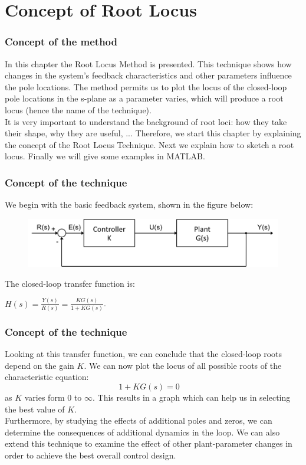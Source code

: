 \section{Concept of Root Locus}

\begin{frame}
\frametitle{Concept of the method}
In this chapter the Root Locus Method is presented. This technique shows how changes in the system's feedback characteristics and other parameters influence the pole locations. The method permits us to plot the locus of the closed-loop pole locations in the s-plane as a parameter varies, which will produce a root locus (hence the name of the technique).\\
\vspace{1em}
It is very important to understand the background of root loci: how they take their shape, why they are useful, ... Therefore, we start this chapter by explaining the concept of the Root Locus Technique. Next we explain how to sketch a root locus. Finally we will give some examples in MATLAB.
\end{frame}

\begin{frame}
\frametitle{Concept of the technique}
	We begin with the basic feedback system, shown in the figure below:
	\begin{figure}
		\centering
		\includegraphics[width=1\linewidth]{closed_loop_diagram}
	\end{figure}
	The closed-loop transfer function is:
	\begin{center}
		$H(s) = \frac{Y(s)}{R(s)} = \frac{KG(s)}{1 + KG(s)}$.
	\end{center}
\end{frame}

\begin{frame}
\frametitle{Concept of the technique}
	Looking at this transfer function, we can conclude that the closed-loop roots depend on the gain $K$. We can now plot the locus of all possible roots of the characteristic equation: 
	\begin{equation}
		1 + KG(s) = 0 \hspace{1em}
	\end{equation}
	as $K$ varies form $0$ to $\infty$. This results in a graph which can help us in selecting the best value of $K$.\\
	\vspace{1em}
	Furthermore, by studying the effects of additional poles and zeros, we can determine the consequences of additional dynamics in the loop. We can also extend this technique to examine the effect of other plant-parameter changes in order to achieve the best overall control design.
\end{frame}

